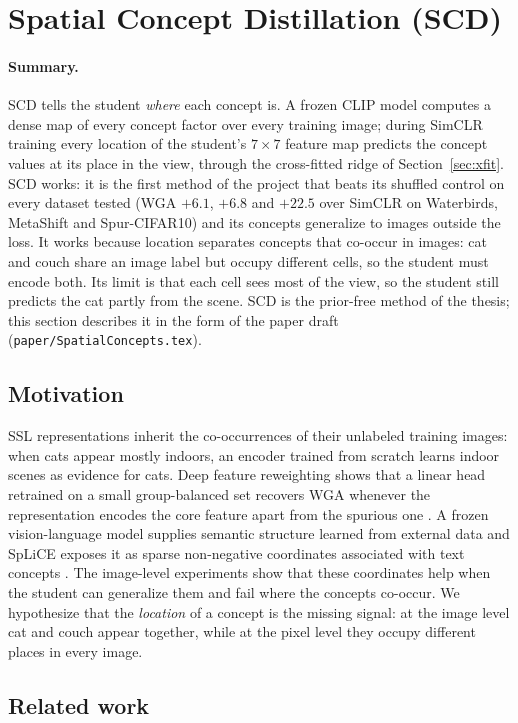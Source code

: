\documentclass[11pt]{article}
\newcommand{\summary}{\paragraph{Summary.}}
\begin{document}
\section{Spatial Concept Distillation (SCD)}
\label{sec:scd}
\summary SCD tells the student \emph{where} each concept is. A frozen CLIP model computes a dense map of every
concept factor over every training image; during SimCLR training every location of the student's $7\times7$
feature map predicts the concept values at its place in the view, through the cross-fitted ridge of
Section~\ref{sec:xfit}. SCD works: it is the first method of the project that beats its shuffled control on every
dataset tested (WGA $+6.1$, $+6.8$ and $+22.5$ over SimCLR on Waterbirds, MetaShift and Spur-CIFAR10) and its
concepts generalize to images outside the loss. It works because location separates concepts that co-occur in
images: cat and couch share an image label but occupy different cells, so the student must encode both. Its
limit is that each cell sees most of the view, so the student still predicts the cat partly from the scene.
SCD is the prior-free method of the thesis; this section describes it in the form of the paper draft
(\texttt{paper/SpatialConcepts.tex}).

\subsection{Motivation}
SSL representations inherit the co-occurrences of their unlabeled training images: when cats appear mostly
indoors, an encoder trained from scratch learns indoor scenes as evidence for cats. Deep feature reweighting shows
that a linear head retrained on a small group-balanced set recovers WGA whenever the representation encodes the
core feature apart from the spurious one \citep{kirichenko2023dfr}. A frozen vision-language model supplies semantic
structure learned from external data and SpLiCE exposes it as sparse non-negative coordinates associated with text
concepts \citep{bhalla2024splice}. The image-level experiments show that these coordinates help when the student
can generalize them and fail where the concepts co-occur. We hypothesize that the \emph{location} of a concept is
the missing signal: at the image level cat and couch appear together, while at the pixel level they occupy
different places in every image.

\subsection{Related work}
\end{document}
